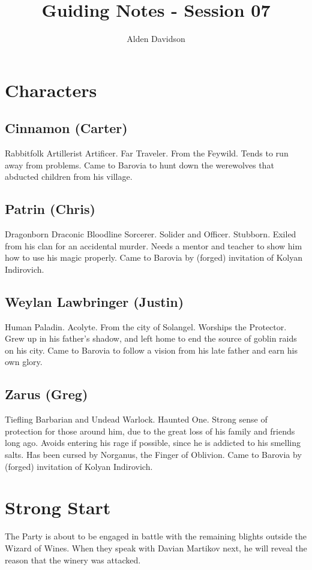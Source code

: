 \documentclass[a4paper,11pt]{article}
\title{Guiding Notes - Session 07}
\author{Alden Davidson}
\begin{document}
\maketitle
\tableofcontents

\pagebreak
\section{Characters}
\label{sec:Characters}
\subsection{Cinnamon (Carter)}
  Rabbitfolk Artillerist Artificer. Far Traveler. From the Feywild. Tends to run away from problems. Came to
  Barovia to hunt down the werewolves that abducted children from his village.
\subsection{Patrin (Chris)}
  Dragonborn Draconic Bloodline Sorcerer. Solider and Officer. Stubborn. Exiled from his clan for an accidental 
  murder. Needs a mentor and teacher to show him how to use his magic properly. Came to Barovia by (forged)
  invitation of Kolyan Indirovich.
\subsection{Weylan Lawbringer (Justin)}
  Human Paladin. Acolyte. From the city of Solangel. Worships the Protector. Grew up in his father's shadow, and 
  left home to end the source of goblin raids on his city. Came to Barovia to follow a vision from his late 
  father and earn his own glory.
\subsection{Zarus (Greg)}
  Tiefling Barbarian and Undead Warlock. Haunted One. Strong sense of protection for those around him, due to the
  great loss of his family and friends long ago. Avoids entering his rage if possible, since he is addicted to 
  his smelling salts. Has been cursed by Norganus, the Finger of Oblivion. Came to Barovia by (forged) 
  invitation of Kolyan Indirovich.


\pagebreak
\section{Strong Start}
\label{sec:StrongStart}
The Party is about to be engaged in battle with the remaining blights outside the Wizard of Wines. When they 
speak with Davian Martikov next, he will reveal the reason that the winery was attacked.
\end{document}
